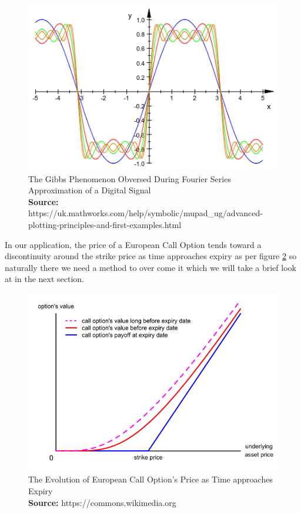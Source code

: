 \documentclass[a4paper]{amsart}
\newcommand*{\captionsource}[2]{%
  \caption[{#1}]{%
    #1%
    \\\hspace{\linewidth}%
    \textbf{Source:} #2%
  }%
}
\begin{document}
\begin{figure}[h]
\centering
\includegraphics[scale=0.5]{GibbsPhenomenon.png}
\captionsource{The Gibbs Phenomenon Obversed During Fourier Series Approximation of a Digital Signal}{ https://uk.mathworks.com/help/symbolic/mupad\_ug/advanced-plotting-principles-and-first-examples.html}
\label {fig:FS}
\end{figure}

In our application, the price of a European Call Option tends toward a discontinuity around the strike price as time approaches expiry as per figure \ref{fig:EuroCall} so naturally there we need a method to over come it which we will take a brief look at in the next section.\\

\begin{figure}[h]
\centering
\includegraphics[scale=0.4]{EuroCallOptionPrice.png}
\captionsource{The Evolution of European Call Option's Price as Time approaches Expiry}{ https://commons.wikimedia.org}
\label {fig:EuroCall}
\end{figure}
\end{document}
